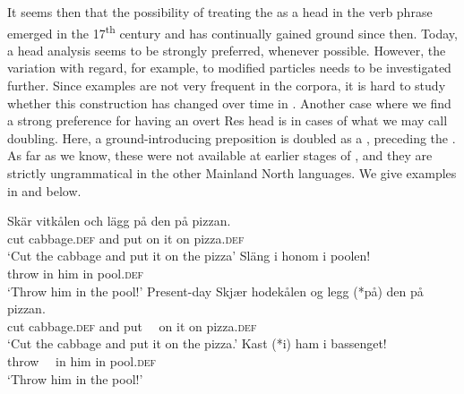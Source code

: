 \documentclass[output=paper]{langscibook}
\begin{document}
\ea\label{ex:lalu:68}
\z
\ex\label{ex:lalu:69}
\z
\z


It seems then that the possibility of treating the  as a head in the verb phrase emerged in the 17\textsuperscript{th} century and has continually gained ground since then. Today, a head analysis seems to be strongly preferred, whenever possible. However, the variation with regard, for example, to modified particles needs to be investigated further. Since examples are not very frequent in the corpora, it is hard to study whether this construction has changed over time in . Another case where we find a strong preference for having an overt Res head is in cases of what we may call  doubling. Here, a ground-introducing preposition is doubled as a , preceding the . As far as we know, these were not available at earlier stages of , and they are strictly ungrammatical in the other Mainland North  languages. We give examples in   and   below.


\ea {}\label{ex:lalu:70}
\ea
\gll  Skär  vitkålen       och  lägg  på   den  på  pizzan.\\
    cut      cabbage.\textsc{def}  and   put   on   it   on   pizza.\textsc{def}\\
\glt `Cut the cabbage and put it on the pizza'
\ex
\gll  Släng   i   honom   i     poolen! \\
    throw   in   him     in     pool\textsc{.def}\\
\glt `Throw him in the pool!'
\z
\ex Present-day \label{ex:lalu:71}
\ea
\gll  Skjær  hodekålen    og   legg  (*på)  den  på   pizzan.\\
    cut    cabbage.\textsc{def}  and  put   ~~on   it     on   pizza.\textsc{def}\\
    \glt `Cut the cabbage and put it on the pizza.'
\ex
\gll  Kast   (*i)   ham   i   bassenget! \\
    throw   ~~in   him   in   pool.\textsc{def}\\
\glt `Throw him in the pool!'
\z
\z
\end{document}
